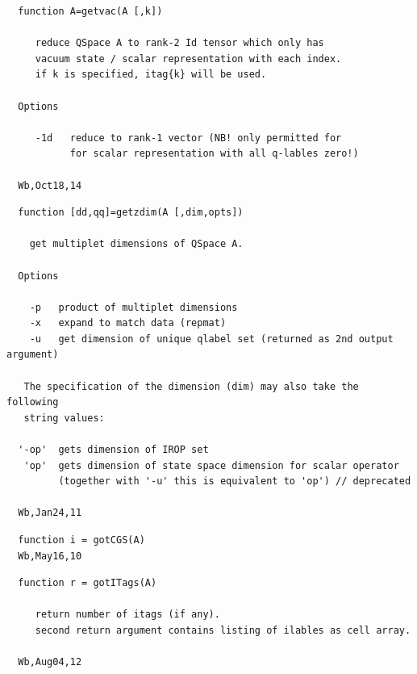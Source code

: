 \documentclass[twoside,12pt]{article}
\begin{document}

\begin{verbatim}
  function A=getvac(A [,k])
 
     reduce QSpace A to rank-2 Id tensor which only has
     vacuum state / scalar representation with each index.
     if k is specified, itag{k} will be used.
 
  Options
 
     -1d   reduce to rank-1 vector (NB! only permitted for
           for scalar representation with all q-lables zero!)
 
  Wb,Oct18,14
\end{verbatim}

\pagebreak[3]



\begin{verbatim}
  function [dd,qq]=getzdim(A [,dim,opts])
 
    get multiplet dimensions of QSpace A.
 
  Options
 
    -p   product of multiplet dimensions
    -x   expand to match data (repmat)
    -u   get dimension of unique qlabel set (returned as 2nd output argument)
 
   The specification of the dimension (dim) may also take the following
   string values:
 
  '-op'  gets dimension of IROP set
   'op'  gets dimension of state space dimension for scalar operator
         (together with '-u' this is equivalent to 'op') // deprecated
 
  Wb,Jan24,11
\end{verbatim}

\pagebreak[3]



\begin{verbatim}
  function i = gotCGS(A)
  Wb,May16,10
\end{verbatim}

\pagebreak[3]



\begin{verbatim}
  function r = gotITags(A)
 
     return number of itags (if any).
     second return argument contains listing of ilables as cell array.
 
  Wb,Aug04,12
\end{verbatim}
\end{document}

